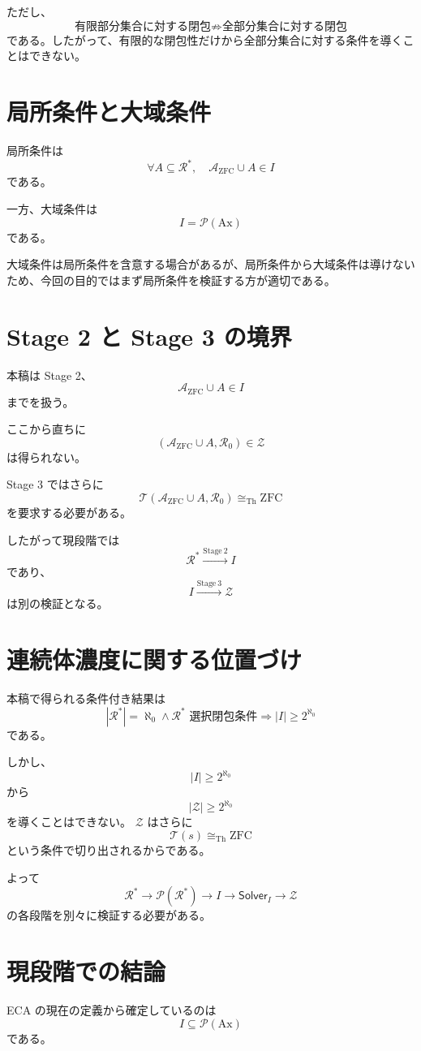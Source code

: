 \documentclass[a4paper,11pt]{article}
\newcommand{\Ax}{\mathrm{Ax}}
\newcommand{\Solver}{\mathsf{Solver}}
\begin{document}
ただし、
\[
\text{有限部分集合に対する閉包}
\not\Rightarrow
\text{全部分集合に対する閉包}
\]
である。したがって、有限的な閉包性だけから全部分集合に対する条件を導くことはできない。

\section{局所条件と大域条件}
局所条件は
\[
\forall A\subseteq\mathcal{R}^*,
\quad
\mathcal{A}_{\mathrm{ZFC}}\cup A\in I
\]
である。

一方、大域条件は
\[
I=\mathcal{P}(\Ax)
\]
である。

大域条件は局所条件を含意する場合があるが、局所条件から大域条件は導けないため、今回の目的ではまず局所条件を検証する方が適切である。

\section{Stage 2 と Stage 3 の境界}
本稿は Stage 2、
\[
\mathcal{A}_{\mathrm{ZFC}}\cup A\in I
\]
までを扱う。

ここから直ちに
\[
(\mathcal{A}_{\mathrm{ZFC}}\cup A,\mathcal{R}_0)\in\mathcal{Z}
\]
は得られない。

Stage 3 ではさらに
\[
\mathcal{T}(\mathcal{A}_{\mathrm{ZFC}}\cup A,\mathcal{R}_0)
\cong_{\mathrm{Th}}\mathrm{ZFC}
\]
を要求する必要がある。

したがって現段階では
\[
\mathcal{R}^*\overset{\mathrm{Stage\ 2}}{\longrightarrow}I
\]
であり、
\[
I\overset{\mathrm{Stage\ 3}}{\longrightarrow}\mathcal{Z}
\]
は別の検証となる。

\section{連続体濃度に関する位置づけ}
本稿で得られる条件付き結果は
\[
|\mathcal{R}^*|=\aleph_0
\land
\text{$\mathcal{R}^*$ 選択閉包条件}
\Longrightarrow
|I|\ge2^{\aleph_0}
\]
である。

しかし、
\[
|I|\ge2^{\aleph_0}
\]
から
\[
|\mathcal{Z}|\ge2^{\aleph_0}
\]
を導くことはできない。 $\mathcal{Z}$ はさらに
\[
\mathcal{T}(s)\cong_{\mathrm{Th}}\mathrm{ZFC}
\]
という条件で切り出されるからである。

よって
\[
\mathcal{R}^*
\to
\mathcal{P}(\mathcal{R}^*)
\to
I
\to
\Solver_I
\to
\mathcal{Z}
\]
の各段階を別々に検証する必要がある。

\section{現段階での結論}
ECA の現在の定義から確定しているのは
\[
I\subseteq\mathcal{P}(\Ax)
\]
である。
\end{document}
